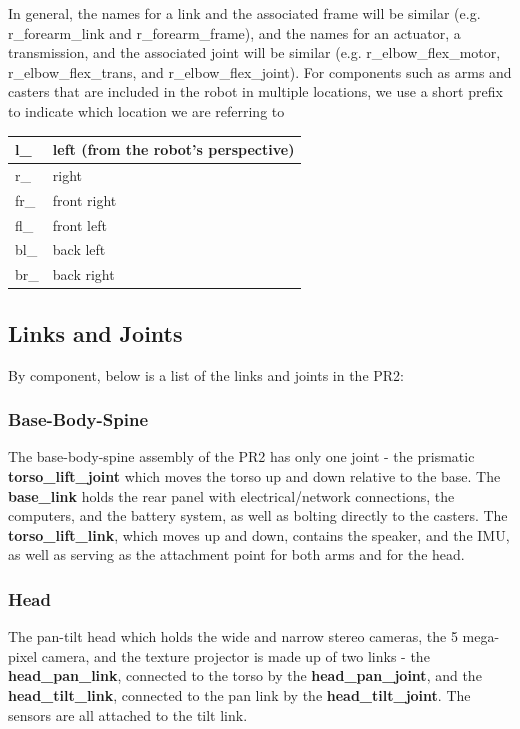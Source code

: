 In general, the names for a link and the associated frame will be similar (e.g. r\_forearm\_link and r\_forearm\_frame), and the names for an actuator, a transmission, and the associated joint will be similar (e.g. r\_elbow\_flex\_motor, r\_elbow\_flex\_trans, and r\_elbow\_flex\_joint).  For components such as arms and casters that are included in the robot in multiple locations, we use a short prefix to indicate which location we are referring to

\begin{tabular}{| l | l |}
\hline
  l\_ & left (from the robot's perspective) \\ \hline
  r\_ & right \\ \hline
  fr\_ & front right \\ \hline
  fl\_ & front left \\ \hline
  bl\_ & back left \\ \hline
  br\_ & back right \\ \hline
\end{tabular}

\subsection{Links and Joints}
By component, below is a list of the links and joints in the PR2:
\subsubsection{Base-Body-Spine}
The base-body-spine assembly of the PR2 has only one joint - the prismatic {\bf torso\_lift\_joint} which moves the torso up and down relative to the base.  The {\bf base\_link} holds the rear panel with electrical/network connections, the computers, and the battery system, as well as bolting directly to the casters.  The {\bf torso\_lift\_link}, which moves up and down, contains the speaker, and the IMU, as well as serving as the attachment point for both arms and for the head.
\subsubsection{Head}
The pan-tilt head which holds the wide and narrow stereo cameras, the 5 mega-pixel camera, and the texture projector is made up of two links - the {\bf head\_pan\_link}, connected to the torso by the {\bf head\_pan\_joint}, and the {\bf head\_tilt\_link}, connected to the pan link by the {\bf head\_tilt\_joint}.  The sensors are all attached to the tilt link.

